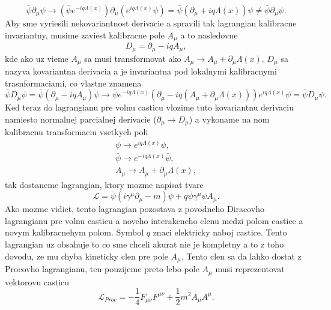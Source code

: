 \documentclass[../../main.tex]{subfiles}
\begin{document}
\begin{equation}
\bar{\psi}\partial_{\mu}\psi \rightarrow (\bar{\psi}e^{-iq\Lambda(x)})\partial_{\mu}(e^{iq\Lambda(x)}\psi)=\bar{\psi}(\partial_{\mu}+iq\Lambda(x))\psi\neq \bar{\psi}\partial_{\mu}\psi.
\end{equation}
Aby sme vyriesili nekovariantnost derivacie a spravili tak lagrangian kalibracne invariantny, musime zaviest kalibracne pole $A_{\mu}$ a to nasledovne
\begin{equation}
D_{\mu}=\partial_{\mu}-iqA_{\mu},
\end{equation}
kde ako uz vieme $A_{\mu}$ sa musi transformovat ako $A_{\mu}\rightarrow A_{\mu}+\partial_{\mu} \Lambda(x)$. $D_{\mu}$ sa nazyva kovariantna derivacia a je invariantna pod lokalnymi kalibracnymi trasnformaciami, co vlastne znamena
\begin{equation}
\bar{\psi}D_{\mu}\psi=\bar{\psi}(\partial_{\mu}-iqA_{\mu})\psi \rightarrow \bar{\psi}e^{-iq\Lambda(x)}(\partial_{\mu} - iq(A_{\mu}+\partial_{\mu}\Lambda(x)))e^{iq\Lambda(x)}\psi=\bar{\psi}D_{\mu}\psi.
\end{equation}
Ked teraz do lagrangianu pre volnu casticu vlozime tuto kovariantnu derivaciu namiesto normalnej parcialnej derivacie ($\partial_{\mu}\rightarrow D_{\mu}$) a vykoname na nom kalibracnu transformaciu vsetkych poli
\begin{equation}
\begin{gathered}
\psi \rightarrow e^{iq\Lambda(x)}\psi, \\
\bar{\psi} \rightarrow e^{-iq\Lambda(x)}\bar{\psi}, \\
A_{\mu}\rightarrow A_{\mu}+\partial_{\mu}\Lambda(x),
\end{gathered}
\end{equation}
tak dostaneme lagrangian, ktory mozme napisat tvare
\begin{equation}
\mathcal{L}=\bar{\psi}(i\gamma^{\mu}\partial_{\mu}-m)\psi+q\bar{\psi}\gamma^{\mu}\psi A_{\mu}.
\end{equation}
Ako mozme vidiet, tento lagrangian pozostava z povodneho Diracovho lagrangianu pre volnu casticu a noveho interakcneho clenu medzi polom castice a novym kalibracnehym polom. Symbol $q$ znaci elektricky naboj castice. Tento lagrangian uz obsahuje to co sme chceli akurat nie je kompletny a to z toho dovodu, ze mu chyba kineticky clen pre pole $A_{\mu}$. Tento clen sa da lahko dostat z Procovho lagrangianu, ten pouzijeme preto lebo pole $A_{\mu}$ musi reprezentovat vektorovu casticu
\begin{equation}
\mathcal{L}_{Proc}=-\frac{1}{4}F_{\mu\nu}F^{\mu\nu}+\frac{1}{2}m^2A_{\mu}A^{\mu}.
\end{equation}
\end{document}
